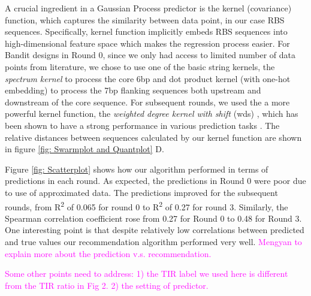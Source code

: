 \documentclass{article}
\newcommand{\mengyan}[1]{\textcolor{magenta}{#1}}
\begin{document}
A crucial ingredient in a Gaussian Process predictor \cite{Rasmussen2004} is the kernel (covariance) function, which captures the similarity between data point, in our case RBS sequences.
Specifically, kernel function implicitly embeds RBS sequences into high-dimensional feature space which makes the regression process easier.
For Bandit designs in Round 0, since we only had access to limited number of data points from literature, we chose to use one of the basic string kernels, the \textit{spectrum kernel} \cite{leslie2001spectrum} to process the core 6bp and dot product kernel \cite{Rasmussen2004} (with one-hot embedding) to process the 7bp flanking sequences both upstream and downstream of the core sequence.
For subsequent rounds, we used the a more powerful kernel function, the \textit{weighted degree kernel with shift} (wds) \cite{ratsch_rase_2005_wds}, which has been shown to have a strong performance in various prediction tasks \cite{Ben-Hur2008}.
The relative distances between sequences calculated by our kernel function are shown in figure \ref{fig: Swarmplot and Quantplot} D.

Figure \ref{fig: Scatterplot} shows how our algorithm performed in terms of predictions in each round. 
As expected, the predictions in Round 0 were poor due to use of approximated data. 
The predictions improved for the subsequent rounds, from R\textsuperscript{2} of 0.065 for round 0 to R\textsuperscript{2} of 0.27 for round 3.
Similarly, the Spearman correlation coefficient rose from 0.27 for Round 0 to 0.48 for Round 3.
One interesting point is that despite relatively low correlations between predicted and true values our recommendation algorithm performed very well.
\mengyan{Mengyan to explain more about the prediction v.s. recommendation.}

\mengyan{Some other points need to address: 
1) the TIR label we used here is different from the TIR ratio in Fig 2. 
2) the setting of predictor.}
\end{document}
